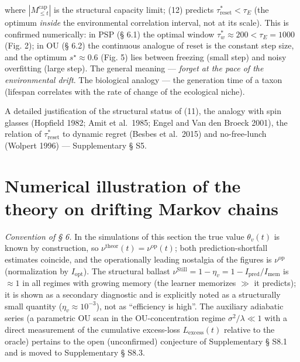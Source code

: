 \documentclass[pdflatex,sn-mathphys-ay]{sn-jnl}
\begin{document}
where \(|M_{\le t}^{\text{cap}}|\) is the structural capacity limit; (12) predicts \(\tau_{\text{reset}}^* < \tau_E\) (the optimum \emph{inside} the environmental correlation interval, not at its scale). This is confirmed numerically: in PSP (§ 6.1) the optimal window \(\tau_w^* \approx 200 < \tau_E = 1000\) (Fig. 2); in OU (§ 6.2) the continuous analogue of reset is the constant step size, and the optimum \(s^\star \approx 0.6\) (Fig. 5) lies between freezing (small step) and noisy overfitting (large step). The general meaning --- \emph{forget at the pace of the environmental drift}. The biological analogy --- the generation time of a taxon (lifespan correlates with the rate of change of the ecological niche).



A detailed justification of the structural status of (11), the analogy with spin glasses (Hopfield 1982; Amit et al.~1985; Engel and Van den Broeck 2001), the relation of \(\tau_{\text{reset}}^*\) to dynamic regret (Besbes et al.~2015) and no-free-lunch (Wolpert 1996) --- Supplementary § S5.



\section{Numerical illustration of the theory on drifting Markov chains}\label{numerical-illustration-of-the-theory-on-drifting-markov-chains}



\emph{Convention of § 6.} In the simulations of this section the true value \(\theta_v(t)\) is known by construction, so \(\nu^{\text{theor}}(t) = \nu^{\text{op}}(t)\); both prediction-shortfall estimates coincide, and the operationally leading nostalgia of the figures is \(\nu^{\text{op}}\) (normalization by \(I_{\text{opt}}\)). The structural ballast \(\nu^{\text{Still}} = 1 - \eta_v = 1 - I_{\text{pred}}/I_{\text{mem}}\) is \(\approx 1\) in all regimes with growing memory (the learner memorizes \(\gg\) it predicts); it is shown as a secondary diagnostic and is explicitly noted as a structurally small quantity (\(\eta_v \approx 10^{-3}\)), not as ``efficiency is high''. The auxiliary adiabatic series (a parametric OU scan in the OU-concentration regime \(\sigma^2/\lambda \ll 1\) with a direct measurement of the cumulative excess-loss \(L_{\text{excess}}(t)\) relative to the oracle) pertains to the open (unconfirmed) conjecture of Supplementary § S8.1 and is moved to Supplementary § S8.3.
\end{document}
